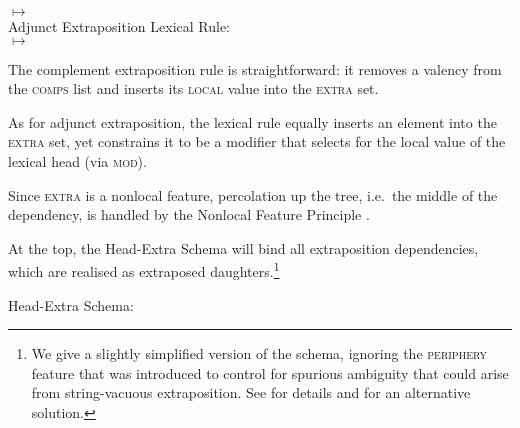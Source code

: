 \documentclass[output=paper
,notxmath 
 	        ,biblatex
                ,babelshorthands
                ,newtxmath
                ,draftmode
                ,colorlinks, citecolor=brown
]{langscibook}
\begin{document}
$\mapsto$ \\
\flushright {}
\z
\eas
Adjunct Extraposition Lexical Rule:\\
$\mapsto$ \\
\flushright{}
\zs


The complement extraposition rule is straightforward: it removes a
valency from the \textsc{comps} list and inserts its \textsc{local}
value into the \textsc{extra} set. 

As for adjunct extraposition, the lexical rule  equally inserts an
element into the \textsc{extra} set, yet constrains it to be a
modifier that selects for the local value of the lexical head (via
\textsc{mod}). 

Since \textsc{extra} is a nonlocal feature, percolation up the tree,
i.e.\ the middle of the dependency, is handled by the Nonlocal Feature
Principle
\citep[]{Pollard:Sag:94}.

At the top, the Head-Extra Schema will bind all extraposition
dependencies, which are realised as extraposed daughters.\footnote{We
  give a slightly simplified version of the schema, ignoring the
  \textsc{periphery} feature that was introduced to control for spurious
  ambiguity that could arise from string-vacuous extraposition. See
  \citet[--305]{Keller:95} for details and
  \citet{Crysmann2005a-u} for an alternative solution. }
\begin{exe}
  \ex Head-Extra Schema:

\end{exe}
\end{document}
